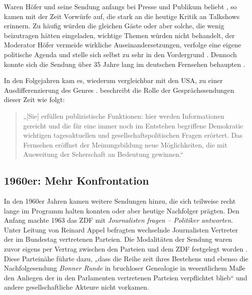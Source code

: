 Waren Höfer und seine Sendung anfangs bei Presse und Publikum beliebt \parencite[115ff.]{kellerGeschichteTalkshowDeutschland2009}, so kamen mit der Zeit Vorwürfe auf, die stark an die heutige Kritik an Talkshows erinnern. Zu häufig würden die gleichen Gäste oder aber solche, die wenig beizutragen hätten eingeladen, wichtige Themen würden nicht behandelt, der Moderator Höfer vermeide wirkliche Auseinandersetzungen, verfolge eine eigene politische Agenda und stelle sich selbst zu sehr in den Vordergrund \parencite[49-58]{o.a.WernerHoeferSchau1959}. Dennoch konnte sich die Sendung über 35 Jahre lang im deutschen Fernsehen behaupten \parencite[119]{kellerGeschichteTalkshowDeutschland2009}.

In den Folgejahren kam es, wiederum vergleichbar mit den USA, zu einer Ausdifferenzierung des Genres \parencite[128-139]{kellerGeschichteTalkshowDeutschland2009}. \textcite[157]{kellerGeschichteTalkshowDeutschland2009} beschreibt die Rolle der Gesprächssendungen dieser Zeit wie folgt:

\begin{quote}
	„[Sie] erfüllen publizistische Funktionen: hier werden Informationen gereicht und die für eine immer noch im Entstehen begriffene Demokratie wichtigen tagesaktuellen und gesellschaftspolitischen Fragen erörtert. Das Fernsehen eröffnet der Meinungsbildung neue Möglichkeiten, die mit Ausweitung der Seherschaft an Bedeutung gewinnen.“
\end{quote}

\subsection{1960er: Mehr Konfrontation}

In den 1960er Jahren kamen weitere Sendungen hinzu, die sich teilweise recht lange im Programm halten konnten oder aber heutige Nachfolger prägten. Den Anfang machte 1963 das ZDF mit \textit{Journalisten fragen – Politiker antworten}. Unter Leitung von Reinard Appel befragten wechselnde Journalisten Vertreter der im Bundestag vertretenen Parteien. Die Modalitäten der Sendung waren zuvor eigens per Vertrag zwischen den Parteien und dem ZDF festgelegt worden \parencite[175-178]{kellerGeschichteTalkshowDeutschland2009}. Diese Parteinähe führte dazu, „dass die Reihe zeit ihres Bestehens und ebenso die Nachfolgesendung \textit{Bonner Runde} in bruchloser Genealogie in wesentlichem Maße den Anliegen der in den Parlamenten vertretenen Parteien verpflichtet blieb“ \parencite[188]{kellerGeschichteTalkshowDeutschland2009} und andere gesellschaftliche Akteure nicht vorkamen.

